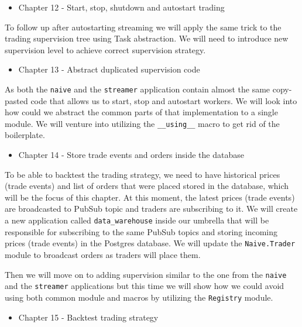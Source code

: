 \documentclass[
]{book}
\providecommand{\tightlist}{%
  \setlength{\itemsep}{0pt}\setlength{\parskip}{0pt}}
\begin{document}
\begin{itemize}
\tightlist
\item
  Chapter 12 - Start, stop, shutdown and autostart trading
\end{itemize}

To follow up after autostarting streaming we will apply the same trick to the trading supervision tree using Task abstraction. We will need to introduce new supervision level to achieve correct supervision strategy.

\begin{itemize}
\tightlist
\item
  Chapter 13 - Abstract duplicated supervision code
\end{itemize}

As both the \texttt{naive} and the \texttt{streamer} application contain almost the same copy-pasted code that allows us to start, stop and autostart workers. We will look into how could we abstract the common parts of that implementation to a single module. We will venture into utilizing the \texttt{\_\_using\_\_} macro to get rid of the boilerplate.

\begin{itemize}
\tightlist
\item
  Chapter 14 - Store trade events and orders inside the database
\end{itemize}

To be able to backtest the trading strategy, we need to have historical prices (trade events) and list of orders that were placed stored in the database, which will be the focus of this chapter. At this moment, the latest prices (trade events) are broadcasted to PubSub topic and traders are subscribing to it. We will create a new application called \texttt{data\_warehouse} inside our umbrella that will be responsible for subscribing to the same PubSub topics and storing incoming prices (trade events) in the Postgres database. We will update the \texttt{Naive.Trader} module to broadcast orders as traders will place them.

Then we will move on to adding supervision similar to the one from the \texttt{naive} and the \texttt{streamer} applications but this time we will show how we could avoid using both common module and macros by utilizing the \texttt{Registry} module.

\begin{itemize}
\tightlist
\item
  Chapter 15 - Backtest trading strategy
\end{itemize}
\end{document}

